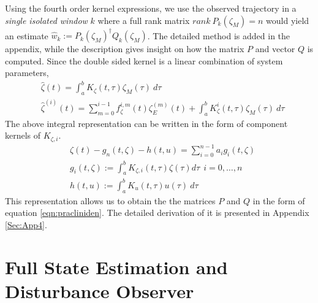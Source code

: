 \documentclass[letterpaper%
, twoside%
, 12pt%
,memoire%
, english%
,creativecommons,hyperref%
]{thETS}
\begin{document}
Using the fourth order kernel expressions, we use the observed trajectory in a {\it single isolated window} $k$ where a full rank matrix $rank \ P_k(\zeta_M) =n$ would yield an estimate $\hat{w}_k := P_k(\zeta_M)^\dagger Q_k(\zeta_M)$. The detailed method is added in the appendix, while the description gives insight on how the matrix $P$ and vector $Q$ is computed. Since the double sided kernel is a linear combination of system parameters, 
\begin{align} \label{eqn:evalEST} 
& \hat{\zeta}(t) = \int_a^b K_{\zeta}(t,\tau) \zeta_M(\tau) \ d \tau \\
& \hat{\zeta}^{(i)}(t) = \sum_{m=0}^{i-1} f_\zeta^{i,m}(t) \zeta_E^{(m)}(t) + \int_a^b K_{\zeta}^{i} (t,\tau) \zeta_M(\tau) \ d \tau 
\end{align}
The above integral representation can be written in the form of component kernels of $K_{\zeta,i}$.
\begin{align}
& \zeta(t) - g_n(t, \zeta) -h(t,u) = \sum_{i=0}^{n-1} a_i  g_i (t, \zeta)  \label{eq:est1} \\
&  g_i( t, \zeta) := \int_a^b K_{\zeta,i} (t,\tau) \zeta(\tau) d \tau  \ \ i = 0, \dots, n \label{rep3} \\
& h(t,u) := \int_a^b K_{u}(t,\tau) u(\tau) \ d \tau \nonumber
\end{align}
This representation allows us to obtain the the matrices $P$ and $Q$ in the form of equation \eqref{eqn:pracliniden}. The detailed derivation of it is presented in Appendix \ref{Sec:App4}.


\section{Full State Estimation and Disturbance Observer} \label{Sec:FullStateEst}
\end{document}
